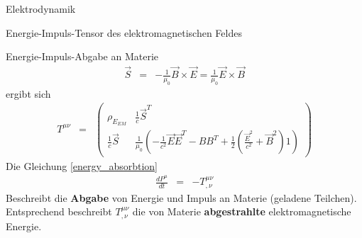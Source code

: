 \begin{chapter}{\titlestr}
\begin{section}{Elektrodynamik}
\begin{subsection}{Energie-Impuls-Tensor des elektromagnetischen Feldes}
\begin{subsubsection}{Energie-Impuls-Abgabe an Materie}
\begin{eqnarray*}
\label{relt_S_def}
\vec{S} &=& -\frac{1}{\mu_0}\vec{B}\times \vec{E}=\frac{1}{\mu_0}\vec{E}\times \vec{B}
\end{eqnarray*}
ergibt sich
\begin{eqnarray*}
T^{\mu\nu} &=&\begin{pmatrix}
\rho_{E_{EM}} &\frac{1}{c}\vec{S}^T\\
\frac{1}{c}\vec{S} &\frac{1}{\mu_0}\left(-\frac{1}{c^2}\vec{E}\vec{E}^T-BB^T+\frac{1}{2}\left(\frac{\vec{E}^2}{c^2}+\vec{B}^2\right)1\right)
\end{pmatrix}
\end{eqnarray*}
Die Gleichung \ref{energy_absorbtion}
\begin{eqnarray*}
\frac{dP^\mu}{dt} &=& -T^{\mu\nu}_{,\nu}
\end{eqnarray*}
Beschreibt die \textbf{Abgabe} von Energie und Impuls an Materie (geladene Teilchen). Entsprechend beschreibt $T^{\mu\nu}_{,\nu}$
die von Materie \textbf{abgestrahlte} elektromagnetische Energie.
\end{subsubsection}


\end{subsection}
\end{section}
\end{chapter}
